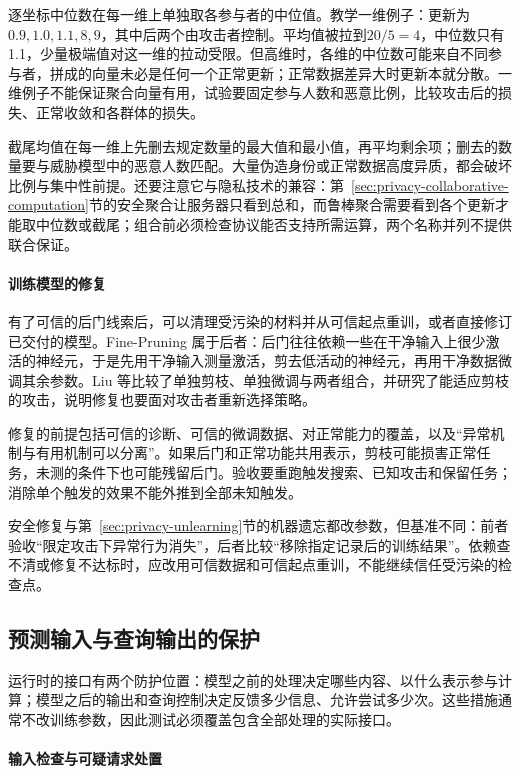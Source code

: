 逐坐标中位数在每一维上单独取各参与者的中位值。教学一维例子：更新为$0.9,1.0,1.1,8,9$，其中后两个由攻击者控制。平均值被拉到$20/5=4$，中位数只有1.1，少量极端值对这一维的拉动受限。但高维时，各维的中位数可能来自不同参与者，拼成的向量未必是任何一个正常更新；正常数据差异大时更新本就分散。一维例子不能保证聚合向量有用，试验要固定参与人数和恶意比例，比较攻击后的损失、正常收敛和各群体的损失。

截尾均值在每一维上先删去规定数量的最大值和最小值，再平均剩余项；删去的数量要与威胁模型中的恶意人数匹配。大量伪造身份或正常数据高度异质，都会破坏比例与集中性前提。还要注意它与隐私技术的兼容：第~\ref{sec:privacy-collaborative-computation}节的安全聚合让服务器只看到总和，而鲁棒聚合需要看到各个更新才能取中位数或截尾；组合前必须检查协议能否支持所需运算，两个名称并列不提供联合保证。

\paragraph{训练模型的修复}

有了可信的后门线索后，可以清理受污染的材料并从可信起点重训，或者直接修订已交付的模型。Fine-Pruning 属于后者：后门往往依赖一些在干净输入上很少激活的神经元，于是先用干净输入测量激活，剪去低活动的神经元，再用干净数据微调其余参数。Liu 等比较了单独剪枝、单独微调与两者组合，并研究了能适应剪枝的攻击，说明修复也要面对攻击者重新选择策略。

修复的前提包括可信的诊断、可信的微调数据、对正常能力的覆盖，以及“异常机制与有用机制可以分离”。如果后门和正常功能共用表示，剪枝可能损害正常任务，未测的条件下也可能残留后门。验收要重跑触发搜索、已知攻击和保留任务；消除单个触发的效果不能外推到全部未知触发。

安全修复与第~\ref{sec:privacy-unlearning}节的机器遗忘都改参数，但基准不同：前者验收“限定攻击下异常行为消失”，后者比较“移除指定记录后的训练结果”。依赖查不清或修复不达标时，应改用可信数据和可信起点重训，不能继续信任受污染的检查点。

\subsection{预测输入与查询输出的保护}
\label{sec:security-information-defense}
\label{sec:security-input-defense}

运行时的接口有两个防护位置：模型之前的处理决定哪些内容、以什么表示参与计算；模型之后的输出和查询控制决定反馈多少信息、允许尝试多少次。这些措施通常不改训练参数，因此测试必须覆盖包含全部处理的实际接口。

\paragraph{输入检查与可疑请求处置}

